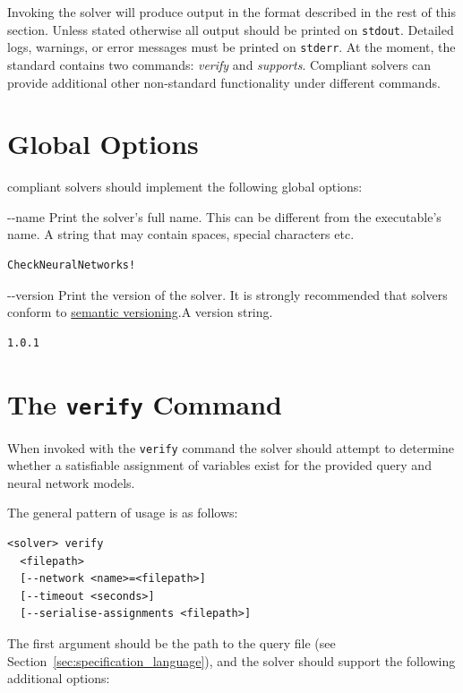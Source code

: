 Invoking the solver will produce output in the format described in the rest of this section. Unless stated otherwise all output should be printed on \texttt{stdout}. Detailed logs, warnings, or error messages must be printed on \texttt{stderr}.
At the moment, the \vnnlib{} standard contains two commands: \emph{verify} and \emph{supports}. Compliant solvers can provide additional other non-standard functionality under different commands. 

\section{Global Options}

\vnnlib{} compliant solvers should implement the following global options:

\clOutputOption
{{-}-name}
{Print the solver's full name. This can be different from the executable's name.}
{A string that may contain spaces, special characters etc.}
\begin{lstlisting}[style=bash]
%*\exampleSolver* --name
CheckNeuralNetworks!
\end{lstlisting}

\clOutputOption
{{-}-version}
{Print the version of the solver. It is strongly recommended that solvers conform to \href{https://semver.org/}{semantic versioning}.}{A version string.}
\begin{lstlisting}[style=bash]
%*\exampleSolver* --version
1.0.1
\end{lstlisting}


\section{The \texttt{verify} Command}
\label{sec:verify_command}

When invoked with the \texttt{verify} command  the solver should attempt to determine whether a satisfiable assignment of variables exist for the provided \vnnlib{} query and neural network models.

The general pattern of usage is as follows:
\begin{lstlisting}[style=bash]
<solver> verify 
  <filepath>
  [--network <name>=<filepath>]
  [--timeout <seconds>]
  [--serialise-assignments <filepath>]
\end{lstlisting}
The first argument should be the path to the \vnnlib{} query file (see Section~\ref{sec:specification_language}), and the solver should support the following additional options:

